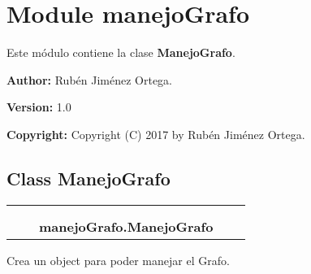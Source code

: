 %
%
%


\section{Module manejoGrafo}

    \label{manejoGrafo}
Este módulo contiene la clase \textbf{ManejoGrafo}.

\textbf{Author:} Rubén Jiménez Ortega.



\textbf{Version:} 1.0



\textbf{Copyright:} Copyright (C) 2017 by Rubén Jiménez Ortega.





\subsection{Class ManejoGrafo}

    \label{manejoGrafo:ManejoGrafo}
\begin{tabular}{cccccc}
\multicolumn{2}{r}{\settowidth{\BCL}{object}\multirow{2}{\BCL}{object}}
&&
  \\\cline{3-3}
  &&\multicolumn{1}{c|}{}
&&
  \\
&&\multicolumn{2}{l}{\textbf{manejoGrafo.ManejoGrafo}}
\end{tabular}

Crea un object para poder manejar el Grafo.



